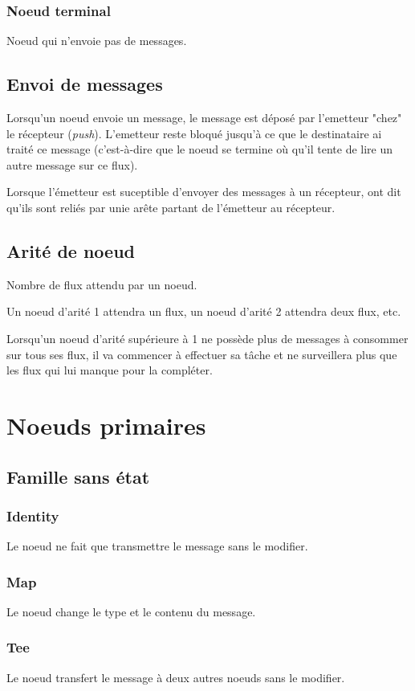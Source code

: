 \documentclass{article}
\begin{document}
\subsubsection{Noeud terminal}
Noeud qui n'envoie pas de messages.

\subsection{Envoi de messages}
Lorsqu'un noeud envoie un message, le message est déposé par l'emetteur "chez" le
récepteur (\emph{push}).
L'emetteur reste bloqué jusqu'à ce que le destinataire ai traité ce message (c'est-à-dire
que le noeud se termine où qu'il tente de lire un autre message sur ce flux).

Lorsque l'émetteur est suceptible d'envoyer des messages à un récepteur, ont dit
qu'ils sont reliés par unie arête partant de l'émetteur au récepteur.

\subsection{Arité de noeud}
Nombre de flux attendu par un noeud.

Un noeud d'arité 1 attendra un flux, un noeud d'arité 2 attendra
deux flux, etc.

Lorsqu'un noeud d'arité supérieure à 1 ne possède plus de messages à consommer sur
tous ses flux, il va commencer à effectuer sa tâche et ne surveillera plus que les
flux qui lui manque pour la compléter.

\section{Noeuds primaires}
\subsection{Famille sans état}
\subsubsection{Identity}
Le noeud ne fait que transmettre le message sans le modifier.

\subsubsection{Map}
Le noeud change le type et le contenu du message.

\subsubsection{Tee}
Le noeud transfert le message à deux autres noeuds sans le modifier.
\end{document}
